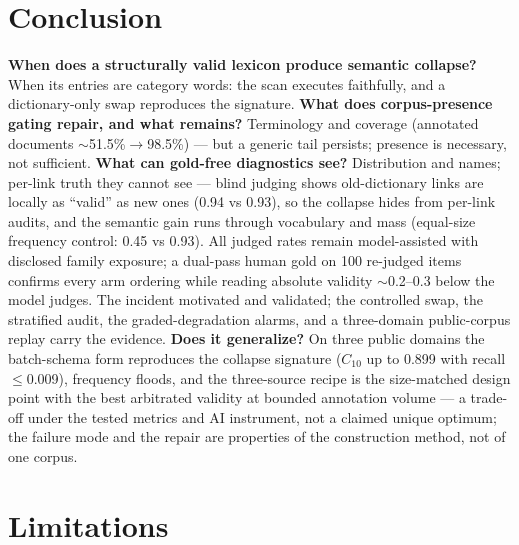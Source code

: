\documentclass[sigconf,nonacm,anonymous]{acmart}
\begin{document}
\section{Conclusion}\label{sec:conclusion}

\textbf{When does a structurally valid lexicon produce semantic
collapse?} When its entries are category words: the scan executes
faithfully, and a dictionary-only swap reproduces the signature.
\textbf{What does corpus-presence gating repair, and what remains?}
Terminology and coverage (annotated documents ${\sim}$51.5\%$\to$98.5\%)
--- but a generic tail persists; presence is necessary, not sufficient.
\textbf{What can gold-free diagnostics see?} Distribution and names;
per-link truth they cannot see --- blind judging shows old-dictionary
links are locally as ``valid'' as new ones (0.94 vs 0.93), so the
collapse hides from per-link audits, and the semantic gain runs through
vocabulary and mass (equal-size frequency control: 0.45 vs 0.93). All
judged rates remain model-assisted with disclosed family exposure; a
dual-pass human gold on 100 re-judged items confirms every arm
ordering while reading absolute validity ${\sim}$0.2--0.3 below the
model judges. The incident motivated and validated; the controlled swap, the stratified
audit, the graded-degradation alarms, and a three-domain public-corpus
replay carry the evidence. \textbf{Does it generalize?} On three public
domains the batch-schema form reproduces the collapse signature
($C_{10}$ up to 0.899 with recall ${\le}$0.009), frequency floods,
and the three-source recipe is the size-matched design point with the
best arbitrated validity at bounded annotation volume --- a trade-off
under the tested metrics and AI instrument, not a claimed unique
optimum; the failure mode and the repair are properties of the construction
method, not of one corpus.

\section{Limitations}\label{sec:limitations}
\end{document}
